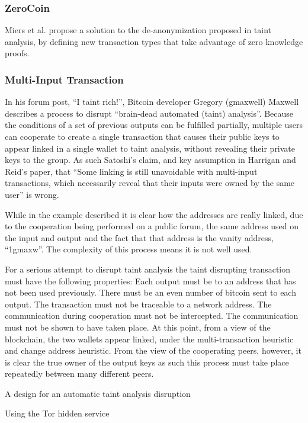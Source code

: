 \subsubsection{ZeroCoin}
Miers et al. propose a solution to the de-anonymization proposed in taint analysis, by defining new transaction types that take advantage of zero knowledge proofs.
\subsubsection{Multi-Input Transaction}

In his forum post, “I taint rich!”, Bitcoin developer Gregory (gmaxwell) Maxwell describes a process to disrupt “brain-dead automated (taint) analysis”.  Because the conditions of a set of previous outputs can be fulfilled partially, multiple users can cooperate to create a single transaction that causes their public keys to appear linked in a single wallet to taint analysis, without revealing their private keys to the group.  As such Satoshi’s claim, and key assumption in Harrigan and Reid’s paper, that “Some linking is still unavoidable with multi-input transactions, which necessarily reveal that their inputs were owned by the same user” is wrong.

While in the example described it is clear how the addresses are really linked, due to the cooperation being performed on a public forum, the same address used on the input and output and the fact that that address is the vanity address, “1gmaxw”. The complexity of this process means it is not well used.

For a serious attempt to disrupt taint analysis the taint disrupting transaction must have the following properties:  Each output must be to an address that has not been used previously. There must be an even number of bitcoin sent to each output. The transaction must not be traceable to a network address.  The communication during cooperation must not be intercepted. The communication must not be shown to have taken place.  At this point, from a view of the blockchain, the two wallets appear linked, under the multi-transaction heuristic and change address heuristic. From the view of the cooperating peers, however, it is clear the true owner of the output keys as such this process must take place repeatedly between many different peers.


    A design for an automatic taint analysis disruption

        Using the Tor hidden service

